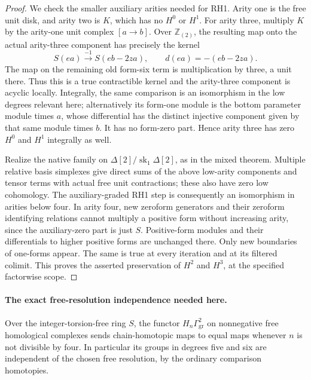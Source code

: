 \begin{proof}
We check the smaller auxiliary arities needed for RH1.
Arity one is the free unit disk, and arity two is \(K\),
which has no \(H^0\) or \(H^1\). For arity three, multiply
\(K\) by the arity-one unit complex \([a\to b]\).
Over \(\mathbb Z_{(2)}\), the resulting map onto the actual
arity-three component has precisely the kernel
\[
       S(ea)\xrightarrow{-1}S(eb-2za),
                 \qquad d(ea)=-(eb-2za).                \tag{136.DR7}
\]
The map on the remaining old form-six term is multiplication
by three, a unit there. Thus this is a true contractible
kernel and the arity-three component is acyclic locally.
Integrally, the same comparison is an isomorphism in the
low degrees relevant here; alternatively its form-one module
is the bottom parameter module times \(a\), whose differential
has the distinct injective component given by that same
module times \(b\). It has no form-zero part. Hence arity
three has zero \(H^0\) and \(H^1\) integrally as well.

Realize the native family on
\(\Delta[2]/\operatorname{sk}_1\Delta[2]\), as in the
mixed theorem. Multiple relative basis simplexes give direct
sums of the above low-arity components and tensor terms with
actual free unit contractions; these also have zero low
cohomology. The auxiliary-graded RH1 step is consequently an
isomorphism in arities below four. In arity four, new
zeroform generators and their zeroform identifying relations
cannot multiply a positive form without increasing arity,
since the auxiliary-zero part is just \(S\). Positive-form
modules and their differentials to higher positive forms
are unchanged there. Only new boundaries of one-forms appear.
The same is true at every iteration and at its filtered
colimit. This proves the asserted preservation of \(H^2\)
and \(H^3\), at the specified factorwise scope.
\end{proof}

\paragraph{The exact free-resolution independence needed here.}
Over the integer-torsion-free ring \(S\), the functor
\(H_n\Gamma^2_{\mathrm{gr}}\) on nonnegative free homological
complexes sends chain-homotopic maps to equal maps whenever
\(n\) is not divisible by four. In particular its groups in
degrees five and six are independent of the chosen free
resolution, by the ordinary comparison homotopies.

